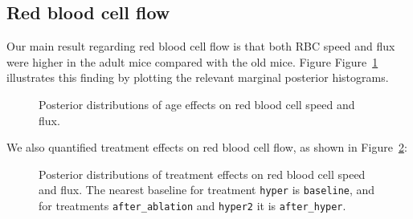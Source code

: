 \documentclass[
  letterpaper,
  DIV=11,
  numbers=noendperiod,
  oneside]{scrartcl}
\theoremstyle{plain}
\theoremstyle{remark}
\begin{document}
\subsection{Red blood cell flow}\label{red-blood-cell-flow}

Our main result regarding red blood cell flow is that both RBC speed and
flux were higher in the adult mice compared with the old mice. Figure
Figure~\ref{fig-flow-age-effects} illustrates this finding by plotting
the relevant marginal posterior histograms.

\begin{figure}


\caption{\label{fig-flow-age-effects}Posterior distributions of age
effects on red blood cell speed and flux.}

\end{figure}%

We also quantified treatment effects on red blood cell flow, as shown in
Figure~\ref{fig-flow-treatment-effects}:

\begin{figure}


\caption{\label{fig-flow-treatment-effects}Posterior distributions of
treatment effects on red blood cell speed and flux. The nearest baseline
for treatment \texttt{hyper} is \texttt{baseline}, and for treatments
\texttt{after\_ablation} and \texttt{hyper2} it is
\texttt{after\_hyper}.}

\end{figure}%
\end{document}
